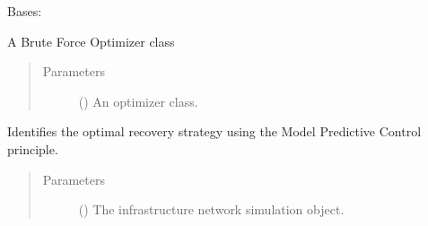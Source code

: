 \documentclass[letterpaper,10pt,english]{sphinxmanual}
\begin{document}
\begin{fulllineitems}
\label{\detokenize{apidoc:dreaminsg_integrated_model.src.optimizer.BruteForceOptimizer}}
\sphinxAtStartPar
Bases: {\hyperref[\detokenize{apidoc:dreaminsg_integrated_model.src.optimizer.Optimizer}]{}}

\sphinxAtStartPar
A Brute Force Optimizer class
\begin{quote}\begin{description}
\item[{Parameters}] \leavevmode
\sphinxAtStartPar
{} () \textendash{} An optimizer class.

\end{description}\end{quote}

\begin{fulllineitems}
\label{\detokenize{apidoc:dreaminsg_integrated_model.src.optimizer.BruteForceOptimizer.find_optimal_recovery}}
\sphinxAtStartPar
Identifies the optimal recovery strategy using the Model Predictive Control principle.
\begin{quote}\begin{description}
\item[{Parameters}] \leavevmode
\sphinxAtStartPar
{} () \textendash{} The infrastructure network simulation object.

\end{description}\end{quote}

\end{fulllineitems}



\end{fulllineitems}
\end{document}
